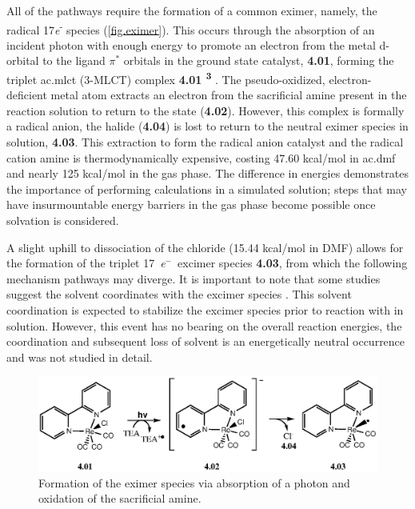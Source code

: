 All of the pathways require the formation of a common eximer, namely, the radical 17\textit{e}\textsuperscript{-} species (\autoref{fig.eximer}). This occurs through the absorption of an incident photon with enough energy to promote an electron from the metal d-orbital to the ligand $\pi^\ast$ orbitals in the ground state catalyst, \textbf{4.01}, forming the triplet \acrlong{ac.mlct} (3-MLCT) complex \textbf{4.01 \textsuperscript{3}} . The pseudo-oxidized, electron-deficient metal atom extracts an electron from the sacrificial amine present in the reaction solution to return to the  state (\textbf{4.02}). However, this complex is formally a radical anion, the halide (\textbf{4.04}) is lost to return to the neutral eximer species in solution, \textbf{4.03}. This extraction to form the radical anion catalyst and the radical cation amine is thermodynamically expensive, costing 47.60 kcal/mol in \gls{ac.dmf} and nearly 125 kcal/mol in the gas phase. The difference in energies demonstrates the importance of performing calculations in a simulated solution; steps that may have insurmountable energy barriers in the gas phase become possible once solvation is considered.

A slight uphill to dissociation of the chloride (15.44 kcal/mol in DMF) allows for the formation of the triplet 17~\textit{e}$^-$~excimer species \textbf{4.03}, from which the following mechanism pathways may diverge. It is important to note that some studies suggest the solvent coordinates with the excimer species \autocite{morris2009, kou2014}. This solvent coordination is expected to stabilize the excimer species prior to reaction with  in solution. However, this event has no bearing on the overall reaction energies, the coordination and subsequent loss of solvent is an energetically neutral occurrence and was not studied in detail.

\begin{figure}[!htb]
 \begin{center}
  \includegraphics[clip=true, width=120mm, keepaspectratio]{images/eximer.eps}
 \end{center}
\caption{Formation of the eximer species via absorption of a photon and oxidation of the sacrificial amine.}
\label{fig.eximer}
\end{figure} 


